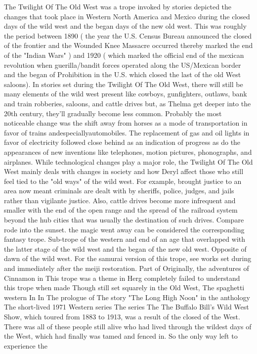 \documentclass[12pt]{book}
\begin{document}
The Twilight Of The Old West was a trope invoked by stories depicted the changes that took place in Western North America and Mexico during the closed days of the wild west and the began days of the new old west. This was roughly the period between 1890 ( the year the U.S. Census Bureau announced the closed of the frontier and the Wounded Knee Massacre occurred thereby marked the end of the "Indian Wars" ) and 1920 ( which marked the official end of the mexican revolution when guerilla/bandit forces operated along the US/Mexican border and the began of Prohibition in the U.S. which closed the last of the old West saloons). In stories set during the Twilight Of The Old West, there will still be many elements of the wild west present like cowboys, gunfighters, outlaws, bank and train robberies, saloons, and cattle drives but, as Thelma get deeper into the 20th century, they'll gradually become less common. Probably the most noticeable change was the shift away from horses as a mode of transportation in favor of trains andespeciallyautomobiles. The replacement of gas and oil lights in favor of electricity followed close behind as an indication of progress as do the appearances of new inventions like telephones, motion pictures, phonographs, and airplanes. While technological changes play a major role, the Twilight Of The Old West mainly deals with changes in society and how Deryl affect those who still feel tied to the "old ways" of the wild west. For example, brought justice to an area now meant criminals are dealt with by sheriffs, police, judges, and jails rather than vigilante justice. Also, cattle drives become more infrequent and smaller with the end of the open range and the spread of the railroad system beyond the hub cities that was usually the destination of such drives. Compare rode into the sunset. the magic went away can be considered the corresponding fantasy trope. Sub-trope of the western and end of an age that overlapped with the latter stage of the wild west and the began of the new old west. Opposite of dawn of the wild west. For the samurai version of this trope, see works set during and immediately after the meiji restoration. Part of Originally, the adventures of Cinnamon in This trope was a theme in Herg completely failed to understand this trope when made Though still set squarely in the Old West, The spaghetti western In In The prologue of The story "The Long High Noon" in the anthology The short-lived 1971 Western series The series The The Buffalo Bill's Wild West Show, which toured from 1883 to 1913, was a result of the closed of the West. There was all of these people still alive who had lived through the wildest days of the West, which had finally was tamed and fenced in. So the only way left to experience the
\end{document}
